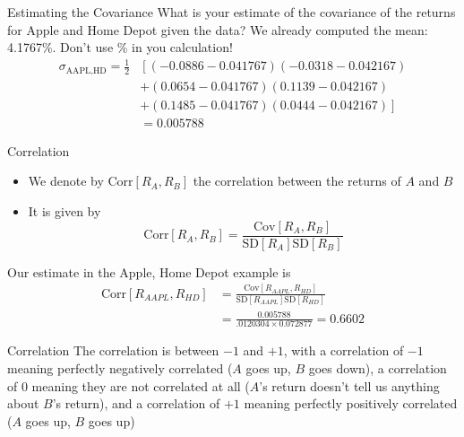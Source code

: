 \documentclass{beamer}
\begin{document}
\begin{frame}{Estimating the Covariance}
	What is your estimate of the covariance of the returns for Apple and Home Depot given the data?
	\pause
	{\color{blue}
	We already computed the mean: 4.1767\%. Don't use \% in you calculation! 
	\begin{align*}
		\sigma_{\text{AAPL,HD}}=\frac{1}{2}&\left[(-0.0886-0.041767)(-0.0318-0.042167)\right.\\
		&\left.+(0.0654-0.041767)(0.1139-0.042167)\right.\\
		&\left.+(0.1485-0.041767)(0.0444-0.042167)\right]\\
		&=0.005788
	\end{align*}
	}
\end{frame}

\begin{frame}{Correlation}
	\begin{itemize}
		\item We denote by $\text{Corr}[R_{A},R_{B}]$ the correlation between the returns of $A$ and $B$
		\item It is given by
			\begin{equation*}
				\text{Corr}[R_{A},R_{B}]=\frac{\text{Cov}[R_{A},R_{B}]}{\text{SD}[R_{A}]\text{SD}[R_{B}]}
			\end{equation*}
	\end{itemize}
\pause
	{\color{blue}
		 Our estimate in the Apple, Home Depot example is
			\begin{align*}
				\text{Corr}[R_{AAPL},R_{HD}]&=\frac{\text{Cov}[R_{AAPL},R_{HD}]}{\text{SD}[R_{AAPL}]\text{SD}[R_{HD}]}\\
				&=\frac{0.005788}{.0120304\times 0.072877}=0.6602
			\end{align*}
}
\end{frame}

\begin{frame}{Correlation}
		The correlation is between $-1$ and $+1$, with a correlation of $-1$ meaning perfectly negatively correlated ($A$ goes up, $B$ goes down), a correlation of $0$ meaning they are not correlated at all ($A$'s return doesn't tell us anything about $B$'s return), and a correlation of $+1$ meaning perfectly positively correlated ($A$ goes up, $B$ goes up) 
\end{frame}
\end{document}
